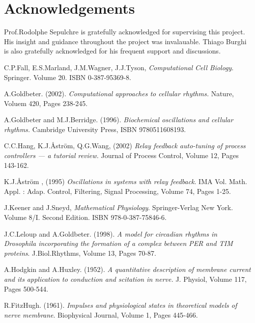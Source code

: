 \documentclass[a4paper, 12pt]{article}
\begin{document}
\section{Acknowledgements}
Prof.Rodolphe Sepulchre is gratefully acknowledged for supervising this project. His insight and guidance throughout the project was invalauable. Thiago Burghi is also gratefully acknowledged for his frequent support and discussions. 

\begin{thebibliography}{9}


C.P.Fall, E.S.Marland, J.M.Wagner, J.J.Tyson, \emph{Computational Cell Biology}. Springer. Volume 20. ISBN 0-387-95369-8. 

A.Goldbeter. (2002). \emph{Computational approaches to cellular rhythms.} Nature, Voluem 420, Pages 238-245.

A.Goldbeter and M.J.Berridge. (1996). \emph{Biochemical oscillations and cellular rhythms.} Cambridge University Press, ISBN 9780511608193. 

C.C.Hang, K.J.\r{A}str\"{o}m, Q.G.Wang, (2002) \emph{Relay feedback auto-tuning of process controllers --- a tutorial review.} Journal of Process Control, Volume 12, Pages 143-162. 

K.J.\r{A}str\"{o}m , (1995) \emph{Oscillations in systems with relay feedback}. IMA Vol. Math. Appl. : Adap. Control, Filtering, Signal Processing, Volume 74, Pages 1-25. 

J.Keener and J.Sneyd, \emph{Mathematical Physiology}. Springer-Verlag New York. Volume 8/I. Second Edition. ISBN 978-0-387-75846-6. 

J.C.Leloup and A.Goldbeter. (1998). \emph{A model for circadian rhythms in Drosophila incorporating the formation of a complex between PER and TIM proteins}. J.Biol.Rhythms, Volume 13, Pages 70-87. 

A.Hodgkin and A.Huxley. (1952). \emph{A quantitative description of membrane current and its application to conduction and scitation in nerve.} J. Physiol, Volume 117, Pages 500-544.

R.FitzHugh. (1961). \emph{Impulses and physiological states in theoretical models of nerve membrane}. Biophysical Journal, Volume 1, Pages 445-466.


\end{thebibliography}
\end{document}
